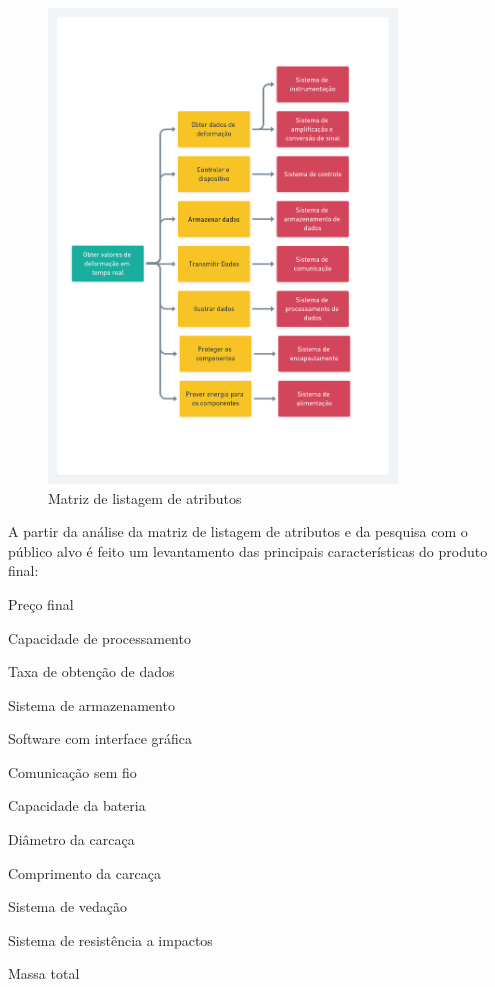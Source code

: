 \begin{figure}[!htb]
	\caption{\label{fig:2031} Matriz de listagem de atributos}
	\begin{center}
		\includegraphics[width=350]{pictures/2031.png}
	\end{center}
\end{figure}

A partir da análise da matriz de listagem de atributos e da pesquisa com o público alvo é feito um levantamento das principais características do produto final:

\begin{alineas}

	\item Preço final
	\item Capacidade de processamento
	\item Taxa de obtenção de dados
	\item Sistema de armazenamento
	\item Software com interface gráfica
	\item Comunicação sem fio
	\item Capacidade da bateria
	\item Diâmetro da carcaça
	\item Comprimento da carcaça
	\item Sistema de vedação
	\item Sistema de resistência a impactos
	\item Massa total

\end{alineas}

